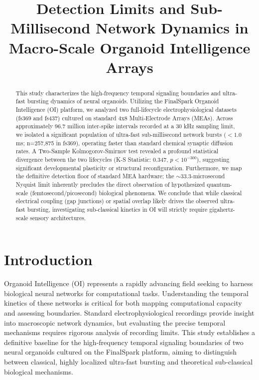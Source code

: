 \documentclass[12pt]{article}
\title{Detection Limits and Sub-Millisecond Network Dynamics in Macro-Scale Organoid Intelligence Arrays}
\author{}
\date{}
\begin{document}
\maketitle

\begin{abstract}
This study characterizes the high-frequency temporal signaling boundaries and ultra-fast bursting dynamics of neural organoids. Utilizing the FinalSpark Organoid Intelligence (OI) platform, we analyzed two full-lifecycle electrophysiological datasets (fs369 and fs437) cultured on standard 4x8 Multi-Electrode Arrays (MEAs). Across approximately 96.7 million inter-spike intervals recorded at a 30 kHz sampling limit, we isolated a significant population of ultra-fast sub-millisecond network bursts ($<1.0$ ms; n=257,875 in fs369), operating faster than standard chemical synaptic diffusion rates. A Two-Sample Kolmogorov-Smirnov test revealed a profound statistical divergence between the two lifecycles (K-S Statistic: 0.347, $p < 10^{-300}$), suggesting significant developmental plasticity or structural reconfiguration. Furthermore, we map the definitive detection floor of standard MEA hardware; the $\sim$33.3-microsecond Nyquist limit inherently precludes the direct observation of hypothesized quantum-scale (femtosecond/picosecond) biological phenomena. We conclude that while classical electrical coupling (gap junctions) or spatial overlap likely drives the observed ultra-fast bursting, investigating sub-classical kinetics in OI will strictly require gigahertz-scale sensory architectures.
\end{abstract}

\section{Introduction}
Organoid Intelligence (OI) represents a rapidly advancing field seeking to harness biological neural networks for computational tasks. Understanding the temporal kinetics of these networks is critical for both mapping computational capacity and assessing boundaries. Standard electrophysiological recordings provide insight into macroscopic network dynamics, but evaluating the precise temporal mechanisms requires rigorous analysis of recording limits. This study establishes a definitive baseline for the high-frequency temporal signaling boundaries of two neural organoids cultured on the FinalSpark platform, aiming to distinguish between classical, highly localized ultra-fast bursting and theoretical sub-classical biological mechanisms.
\end{document}
